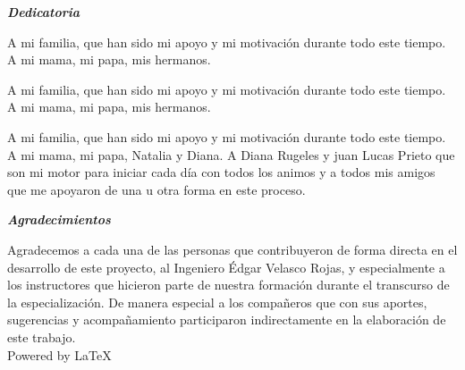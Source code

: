 \begin{flushright}

{\LARGE{\bf {\em Dedicatoria}}} \\

\vspace*{1in}

A mi familia, que han sido mi apoyo y mi motivación durante todo este tiempo.
A mi mama, mi papa, mis hermanos.\\
{\bf{\em \tesisautora}}

\vspace*{0.8in}

A mi familia, que han sido mi apoyo y mi motivación durante todo este tiempo.
A mi mama, mi papa, mis hermanos. \\
{\bf{\em \tesisautorb}}

\vspace*{0.8in}

A mi familia, que han sido mi apoyo y mi motivación durante todo este tiempo.
A mi mama, mi papa, Natalia y Diana. 
A Diana Rugeles y juan Lucas Prieto que son mi motor para iniciar cada día con todos los animos y a todos mis amigos que me apoyaron de una u otra forma en este proceso.\\
{\bf{\em \tesisautorc}}

\end{flushright}

\newpage


\begin{flushright}

{\LARGE{\bf {\em Agradecimientos}}} \\

\vspace*{1in}

Agradecemos a cada una de las personas que contribuyeron de forma directa en el desarrollo de este proyecto, al Ingeniero Édgar Velasco Rojas, y especialmente a los instructores que hicieron parte de nuestra formación durante el transcurso de la especialización. 
De manera especial a los compañeros que con sus aportes, sugerencias y acompañamiento participaron indirectamente en la elaboración de este trabajo.\\
\vspace*{6in}
Powered by \LaTeX
\end{flushright}